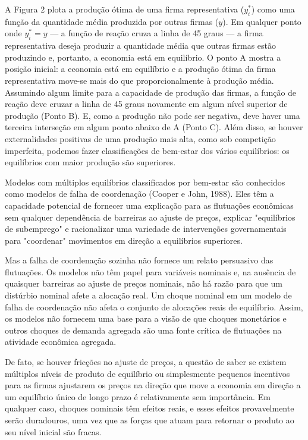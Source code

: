\documentclass[12pt]{article}
\begin{document}
{A Figura 2 plota a produção ótima de uma firma representativa ($y^*_i$) como uma função da quantidade média produzida por outras firmas ($y$). Em qualquer ponto onde $y^*_i = y$ — a função de reação cruza a linha de 45 graus — a firma representativa deseja produzir a quantidade média que outras firmas estão produzindo e, portanto, a economia está em equilíbrio. O ponto A mostra a posição inicial: a economia está em equilíbrio e a produção ótima da firma representativa move-se mais do que proporcionalmente à produção média. Assumindo algum limite para a capacidade de produção das firmas, a função de reação deve cruzar a linha de 45 graus novamente em algum nível superior de produção (Ponto B). E, como a produção não pode ser negativa, deve haver uma terceira interseção em algum ponto abaixo de A (Ponto C). Além disso, se houver externalidades positivas de uma produção mais alta, como sob competição imperfeita, podemos fazer classificações de bem-estar dos vários equilíbrios: os equilíbrios com maior produção são superiores.

Modelos com múltiplos equilíbrios classificados por bem-estar são conhecidos como modelos de falha de coordenação (Cooper e John, 1988). Eles têm a capacidade potencial de fornecer uma explicação para as flutuações econômicas sem qualquer dependência de barreiras ao ajuste de preços, explicar "equilíbrios de subemprego" e racionalizar uma variedade de intervenções governamentais para "coordenar" movimentos em direção a equilíbrios superiores.

Mas a falha de coordenação sozinha não fornece um relato persuasivo das flutuações. Os modelos não têm papel para variáveis nominais e, na ausência de quaisquer barreiras ao ajuste de preços nominais, não há razão para que um distúrbio nominal afete a alocação real. Um choque nominal em um modelo de falha de coordenação não afeta o conjunto de alocações reais de equilíbrio. Assim, os modelos não fornecem uma base para a visão de que choques monetários e outros choques de demanda agregada são uma fonte crítica de flutuações na atividade econômica agregada.

De fato, se houver fricções no ajuste de preços, a questão de saber se existem múltiplos níveis de produto de equilíbrio ou simplesmente pequenos incentivos para as firmas ajustarem os preços na direção que move a economia em direção a um equilíbrio único de longo prazo é relativamente sem importância. Em qualquer caso, choques nominais têm efeitos reais, e esses efeitos provavelmente serão duradouros, uma vez que as forças que atuam para retornar o produto ao seu nível inicial são fracas.

}
\end{document}
